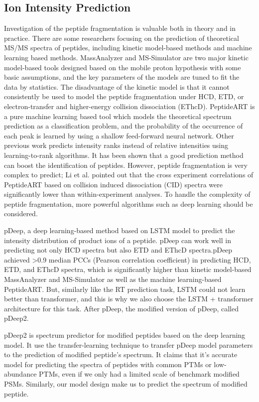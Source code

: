 \subsection{Ion Intensity Prediction}
Investigation of the peptide fragmentation is valuable both in theory and in practice. There are some researchers
focusing on the prediction of theoretical MS/MS spectra of peptides, including kinetic model-based methods and machine
learning based methods. MassAnalyzer\cite{zhang2004prediction, zhang2005prediction} and MS-Simulator\cite{sun2012ms,wang2015openms}
are two major kinetic model-based tools designed based on
the mobile proton hypothesis with some basic assumptions, and the key parameters of the models are tuned to ﬁt the data
by statistics. The disadvantage of the kinetic model is that it cannot consistently be used to model the peptide
fragmentation under HCD, ETD, or electron-transfer and higher-energy collision dissociation (EThcD). PeptideART is
 a pure machine learning based tool which models the theoretical spectrum prediction as a classification problem, and
 the probability of the occurrence of each peak is learned by using a shallow feed-forward neural network\cite{arnold2006machine,li2011accuracy}.
 Other previous work\cite{frank2009ranking} predicts intensity ranks instead of relative intensities using learning-to-rank algorithms.
 It has been shown that a good prediction method can boost the identification of peptides. However, peptide
 fragmentation is very complex to predict; Li et al.\cite{li2011accuracy} pointed out that the cross experiment correlations of PeptideART
 based on collision induced dissociation (CID) spectra were significantly lower than within-experiment analyses. To
 handle the complexity of peptide fragmentation, more powerful algorithms such as deep learning should be considered.

pDeep\cite{zhou2017pdeep}, a deep learning-based method based on LSTM model to predict the intensity distribution of product ions of a peptide. pDeep can
work well in predicting not only HCD spectra but also ETD and EThcD spectra.pDeep achieved >0.9 median PCCs (Pearson correlation coefficient)
in predicting HCD, ETD, and EThcD spectra, which is significantly higher than kinetic model-based MassAnalyzer and MS-Simulator as well
as the machine learning-based PeptideART. But, similarly like the RT prediction task, LSTM could not learn better than transformer, and this is why
we also choose the LSTM + transformer architecture for this task. After pDeep, the modified version of pDeep, called pDeep2\cite{zeng2019ms}.

pDeep2 is spectrum predictor for modiﬁed peptides based on the deep learning model. It use the transfer-learning technique to transfer pDeep model
parameters to the prediction of modified peptide's spectrum. It claims that it's accurate model for predicting the spectra of peptides with common PTMs or low-abundance PTMs,
even if we only had a limited scale of benchmark modiﬁed PSMs.  Similarly, our model design make us to predict the spectrum of modified peptide.